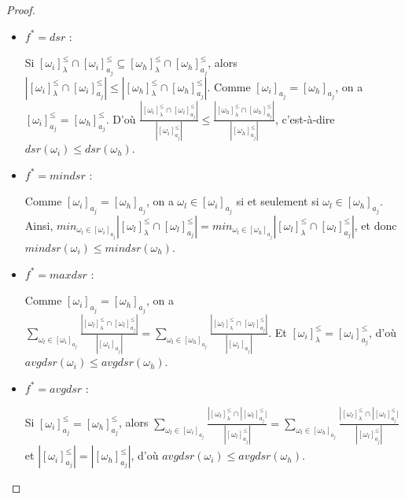 \documentclass[a4paper]{article}
\begin{document}
\begin{proof}
\begin{itemize}
    \item $f^* = dsr$ :

Si $[\omega_i]^{\leq}_{\lambda} \cap [\omega_i]^{\leq}_{a_j} \subseteq
        [\omega_h]^{\leq}_{\lambda} \cap [\omega_h]^{\leq}_{a_j}$, alors
        $|[\omega_i]^{\leq}_{\lambda} \cap [\omega_i]^{\leq}_{a_j}| \leq
        |[\omega_h]^{\leq}_{\lambda} \cap [\omega_h]^{\leq}_{a_j}|$. Comme
        $[\omega_i]_{a_j} = [\omega_h]_{a_j}$, on a $[\omega_i]^{\leq}_{a_j} =
        [\omega_h]^{\leq}_{a_j}$. D'où $\frac{|[\omega_i]^{\leq}_{\lambda} \cap
        [\omega_i]^{\leq}_{a_j}|}{|[\omega_i]^{\leq}_{a_j}|} \leq
        \frac{|[\omega_h]^{\leq}_{\lambda} \cap
        [\omega_h]^{\leq}_{a_j}|}{|[\omega_h]^{\leq}_{a_j}|}$, c'est-à-dire
        $dsr(\omega_i) \leq dsr(\omega_h)$.

    \item $f^* = mindsr$ : 
        
        Comme $[\omega_i]_{a_j} = [\omega_h]_{a_j}$, on a  $\omega_l \in
        [\omega_i]_{a_j}$ si et seulement si $\omega_l \in [\omega_h]_{a_j}$.
        Ainsi, $min_{\omega_l \in [\omega_i]_{a_j}} |[\omega_l]^{\leq}_{\lambda}
        \cap [\omega_l]^{\leq}_{a_j}| = min_{\omega_l \in [\omega_h]_{a_j}}
        |[\omega_l]^{\leq}_{\lambda} \cap [\omega_l]^{\leq}_{a_j}|$, et donc
        $mindsr(\omega_i) \leq mindsr(\omega_h)$.
    
    \item $f^* = maxdsr$ : 

        Comme $[\omega_i]_{a_j} = [\omega_h]_{a_j}$, on a $\sum_{\omega_l \in
        [\omega_i]_{a_j}} \frac{|[\omega_l]^{\leq}_{\lambda} \cap
        [\omega_l]^{\leq}_{a_j}|}{|[\omega_i]_{a_j}|} = \sum_{\omega_l \in
        [\omega_h]_{a_j}} \frac{|[\omega_l]^{\leq}_{\lambda} \cap
        [\omega_l]^{\leq}_{a_j}|}{|[\omega_i]_{a_j}|}$. Et
        $[\omega_i]^{\leq}_{\lambda} = [\omega_i]^{\leq}_{a_j}$, d'où
        $avgdsr(\omega_i) \leq avgdsr(\omega_h)$.

    \item $f^* = avgdsr$ :

        Si $[\omega_i]^{\leq}_{a_j} = [\omega_h]^{\leq}_{a_j}$, alors
        $\sum_{\omega_l \in [\omega_i]_{a_j}} \frac{|[\omega_l]^{\leq}_{\lambda}
        \cap |[\omega_l]^{\leq}_{a_j}|}{|[\omega_l]^{\leq}_{a_j}|} =
        \sum_{\omega_l \in [\omega_h]_{a_j}} \frac{|[\omega_l]^{\leq}_{\lambda}
        \cap |[\omega_l]^{\leq}_{a_j}|}{|[\omega_l]^{\leq}_{a_j}|}$ et
        $|[\omega_i]^{\leq}_{a_j}| = |[\omega_h]^{\leq}_{a_j}|$, d'où
        $avgdsr(\omega_i) \leq avgdsr(\omega_h)$.

\end{itemize}
\end{proof}
\end{document}
